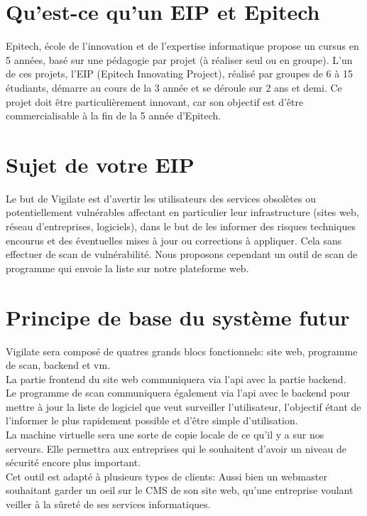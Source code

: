\section{Qu'est-ce qu’un EIP et Epitech}
Epitech, école de l'innovation et de l'expertise informatique propose un cursus en 5 années, basé sur une pédagogie par projet (à réaliser seul ou en groupe). L'un de ces projets, l’EIP (Epitech Innovating Project), réalisé par groupes de 6 à 15 étudiants, démarre au cours de la 3\ieme{} année et se déroule sur 2 ans et demi. Ce projet doit être particulièrement innovant, car son objectif est d’être commercialisable à la fin de la 5\ieme{} année d’Epitech.

\section{Sujet de votre EIP}
Le but de Vigilate est d’avertir les utilisateurs des services obsolètes ou potentiellement vulnérables affectant en particulier leur infrastructure (sites web, réseau d'entreprises, logiciels), dans le but de les informer des risques techniques encourus et des éventuelles mises à jour ou corrections à appliquer.
Cela sans effectuer de scan de vulnérabilité.
Nous proposons cependant un outil de scan de programme qui envoie la liste sur notre plateforme web.

\section{Principe de base du système futur}
Vigilate sera composé de quatres grands blocs fonctionnels: site web, programme de scan, backend et vm.\\
La partie frontend du site web communiquera via l’api avec la partie backend.\\
Le programme de scan communiquera également via l’api avec le backend pour mettre à jour la liste de logiciel que veut surveiller l’utilisateur, l'objectif étant de l’informer le plus rapidement possible et d’être simple d’utilisation.\\
La machine virtuelle sera une sorte de copie locale de ce qu’il y a sur nos serveurs. Elle permettra aux entreprises qui le souhaitent d’avoir un niveau de sécurité encore plus important.\\
Cet outil est adapté à plusieurs types de clients: Aussi bien un webmaster souhaitant garder un oeil sur le CMS de son site web, qu’une entreprise voulant veiller à la sûreté de ses services informatiques.\\

